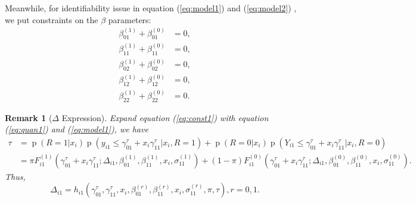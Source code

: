 \documentclass[12pt]{article}
\newtheorem{rmk}[thm]{Remark}
\DeclareMathOperator{\pr}{p}
\begin{document}
Meanwhile, for identifiability issue in equation (\ref{eq:model1}) and
(\ref{eq:model2}) , we put constraints on the $\beta$ parameters:
\begin{align}
\label{eq:beta01}
  \beta_{01}^{(1)} + \beta_{01}^{(0)} & = 0 ,\\
\label{eq:beta11}
  \beta_{11}^{(1)} + \beta_{11}^{(0)} & = 0, \\
  \label{eq:beta02}
  \beta_{02}^{(1)} + \beta_{02}^{(0)} & = 0, \\
  \label{eq:beta12}
  \beta_{12}^{(1)} + \beta_{12}^{(0)} & = 0, \\
  \label{eq:beta22}
  \beta_{22}^{(1)} + \beta_{22}^{(0)} & = 0.
\end{align}

\begin{rmk}[$\Delta$ Expression]\label{sec:delta}
  Expand equation (\ref{eq:const1}) with equation (\ref{eq:quan1}) and
  (\ref{eq:model1}), we have
  \begin{align}
    \tau & = \pr (R = 1 | x_i) \pr (y_{i1} \leq \gamma^{\tau}_{01} + x_i \gamma^{\tau}_{11} | x_i , R = 1) + \pr(R = 0 | x_i) \pr (Y_{i1} \leq \gamma^{\tau}_{01} + x_i \gamma^{\tau}_{11} | x_i , R = 0)  \\
\label{eq:delta10}
    & = \pi F_{i1}^{(1)} (\gamma^{\tau}_{01} + x_i \gamma^{\tau}_{11}; \Delta_{i1},
    \beta_{01}^{(1)}, \beta_{11}^{(1)}, x_i, \sigma_{11}^{(1)}) +
    (1-\pi)F_{i1}^{(0)} (\gamma^{\tau}_{01} + x_i \gamma^{\tau}_{11};
    \Delta_{i1}, \beta_{01}^{(0)}, \beta_{11}^{(0)}, x_i, \sigma_{11}^{(0)}).
  \end{align}
  Thus,
  \begin{equation}
    \label{eq:delta1}
    \Delta_{i1} = h_{i1}(\gamma^{\tau}_{01} , \gamma^{\tau}_{11}, x_{i}, \beta_{01}^{(r)}, \beta_{11}^{(r)}, x_i, \sigma_{11}^{(r)}, \pi, \tau ), r = 0, 1.
  \end{equation}


\end{rmk}
\end{document}
